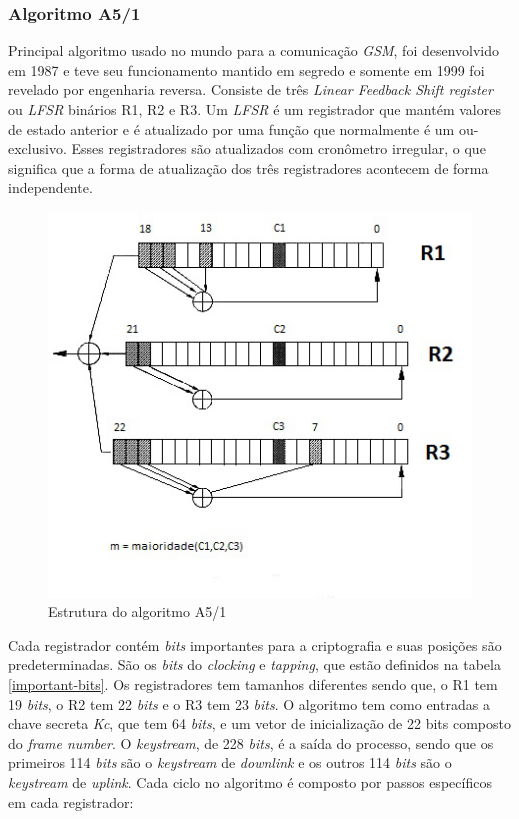 \subsubsection{Algoritmo A5/1}
\label{algorithm-a51}

Principal algoritmo usado no mundo para a comunicação \textit{GSM}, foi desenvolvido em 1987 e teve seu funcionamento mantido em segredo e somente em 1999 foi revelado por engenharia reversa. Consiste de três \textit{Linear Feedback Shift register} ou \textit{LFSR} binários R1, R2 e R3. Um \textit{LFSR} é um registrador que mantém valores de estado anterior e é atualizado por uma função que normalmente é um ou-exclusivo. Esses registradores são atualizados com cronômetro irregular, o que significa que a forma de atualização dos três registradores acontecem de forma independente. 

\begin{figure}[h]
\centering
\includegraphics[keepaspectratio=true,scale=0.9]
    {figuras/a5_1.eps}
    \caption[Estrutura do algoritmo A5/1]{Estrutura do algoritmo A5/1\protect\footnotemark} 
\end{figure}

Cada registrador contém \textit{bits} importantes para a criptografia e suas posições são predeterminadas. São os \textit{bits} do \textit{clocking} e \textit{tapping}, que estão definidos na tabela \ref{important-bits}. Os registradores tem tamanhos diferentes sendo que, o R1 tem 19 \textit{bits}, o R2 tem 22 \textit{bits} e o R3 tem 23 \textit{bits}. O algoritmo tem como entradas a chave secreta \textit{Kc}, que tem 64 \textit{bits}, e um vetor de inicialização de 22 bits composto do \textit{frame number}. O \textit{keystream}, de 228 \textit{bits}, é a saída do processo, sendo que os primeiros 114 \textit{bits} são o \textit{keystream} de \textit{downlink} e os outros 114 \textit{bits} são o \textit{keystream} de \textit{uplink}. Cada ciclo no algoritmo é composto por passos específicos em cada registrador:

